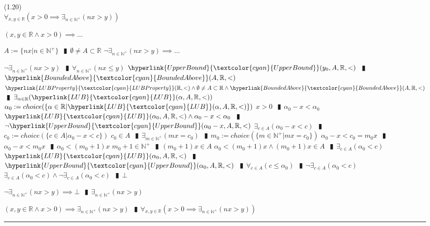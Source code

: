 \documentclass{book}
\newcommand{\wff}[1]{\hypertarget{#1}{\fbox{\textcolor{red}{$#1$}}\phantom{--}}}
\newcommand{\rf}[1]{\hyperlink{#1}{\textcolor{cyan}{#1}}}
\newcommand{\abr}{:=}
\newcommand{\pipe}{$\phantom{(}\vrectangleblack\phantom{)}$}
\newcommand{\pr}[1]{\left(#1\right)}
\begin{document}
(1.20) \\
\wff{ArchimedeanPropertyOfR} $\forall_{x, y \in \mathbb{R}}\pr{x > 0 \implies \exists_{n \in \mathbb{N}^+}(n x > y)}$
\begin{enumerate}
  \lit $(x, y \in \mathbb{R} \land x > 0) \implies \ldots$
  \begin{enumerate}
    \lit $A \abr \{n x | n \in \mathbb{N}^+\}$ \pipe $\emptyset \neq A \subset \mathbb{R}$
    \lit $\lnot \exists_{n \in \mathbb{N}^+}(n x > y) \implies \ldots$
    \begin{enumerate}
      \lit $\lnot \exists_{n \in \mathbb{N}^+}(n x > y)$ \pipe $\forall_{n \in \mathbb{N}^+}(n x \leq y)$
      \lit $\rf{UpperBound}(y_0, A, \mathbb{R}, <)$ \pipe $\rf{BoundedAbove}(A, \mathbb{R}, <)$
      \lit $\rf{LUBProperty}(\mathbb{R}, <) \land \emptyset \neq A \subset \mathbb{R} \land \rf{BoundedAbove}(A, \mathbb{R}, <)$ \pipe $\exists_{\alpha \in \mathbb{R}}(\rf{LUB}(\alpha, A, \mathbb{R}, <))$
      \lit $\alpha_0 \abr choice(\{\alpha \in \mathbb{R} | \rf{LUB}(\alpha, A, \mathbb{R}, <)\})$
      \lit $x > 0$ \pipe $\alpha_0 - x < \alpha_0$
      \lit $\rf{LUB}(\alpha_0, A, \mathbb{R}, <) \land \alpha_0 - x < \alpha_0$ \pipe $\lnot \rf{UpperBound}(\alpha_0 - x, A, \mathbb{R}, <)$
      \lit $\exists_{c \in A}(\alpha_0 - x < c)$ \pipe $c_0 \abr choice(\{c \in A | \alpha_0 - x < c\})$
      \lit $c_0 \in A$ \pipe $\exists_{m \in \mathbb{N}^+}(m x = c_0)$ \pipe $m_0 \abr choice(\{m \in \mathbb{N}^+ | m x = c_0\})$
      \lit $\alpha_0 - x < c_0 = m_0 x$ \pipe $\alpha_0 - x < m_0 x$ \pipe $\alpha_0 < (m_0 + 1) x$
      \lit $m_0 + 1 \in \mathbb{N}^+$ \pipe $(m_0 + 1) x \in A$
      \lit $\alpha_0 < (m_0 + 1) x \land (m_0 + 1) x \in A$ \pipe $\exists_{c \in A}(\alpha_0 < c)$
      \lit $\rf{LUB}(\alpha_0, A, \mathbb{R}, <)$ \pipe $\rf{UpperBound}(\alpha_0, A, \mathbb{R}, <)$ \pipe $\forall_{c \in A}(c \leq \alpha_0)$ \pipe $\lnot \exists_{c \in A}(\alpha_0 < c)$
      \lit $\exists_{c \in A}(\alpha_0 < c) \land \lnot \exists_{c \in A}(\alpha_0 < c)$ \pipe $\bot$
    \end{enumerate}
    \lit $\lnot \exists_{n \in \mathbb{N}^+}(n x > y) \implies \bot$ \pipe $\exists_{n \in \mathbb{N}^+}(n x > y)$
  \end{enumerate}
  \lit $(x, y \in \mathbb{R} \land x > 0) \implies \exists_{n \in \mathbb{N}^+}(n x > y)$ \pipe $\forall_{x, y \in \mathbb{R}}\pr{x > 0 \implies \exists_{n \in \mathbb{N}^+}(n x > y)}$
\end{enumerate} \vspace{.75mm} \hrule \vspace{.75mm} \ \\ 
\end{document}
